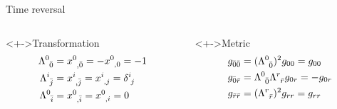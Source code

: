 \documentclass{beamer}
\let\svthefootnote\thefootnote
\newcommand\blankfootnote[1]{%
  \let\thefootnote\relax\footnotetext{#1}%
  \let\thefootnote\svthefootnote%
}
\begin{document}
\begin{frame}{Time reversal}


\begin{columns}[t]
  \begin{column}{0.4\textwidth}
    \begin{block}<+->{Transformation}
      \begin{align*}
          \tensor{\Lambda}{^0_{\bar0}} &=
          \tensor{x}{^0_{,\bar0}} = -\tensor{x}{^0_{,0}} = -1
          \\
          \tensor{\Lambda}{^i_{\bar{j}}} &=
          \tensor{x}{^i_{,\bar{j}}} = \tensor{x}{^i_{,j}} = \tensor{\delta}{^i_j}
          \\
          \tensor{\Lambda}{^0_{\bar{i}}} &=
          \tensor{x}{^0_{,\bar{i}}} = \tensor{x}{^0_{,i}} = 0
        \end{align*}
    \end{block}
  \end{column}

  \begin{column}{0.4\textwidth}
    \begin{block}<+->{Metric}
      \begin{align*}
        g_{\bar0 \bar0} &=
        (\tensor{\Lambda}{^0_{\bar0}})^2 g_{00} =
        g_{00}
        \\
        g_{\bar0 \bar{r}} &=
        \tensor{\Lambda}{^0_{\bar0}} \tensor{\Lambda}{^r_{\bar{r}}} g_{0r} =
        -g_{0r}
        \\
        g_{\bar{r} \bar{r}} &=
        (\tensor{\Lambda}{^r_{\bar{r}}})^2 g_{rr} =
        g_{rr}
      \end{align*}
    \end{block}
  \end{column}
\end{columns}

\blankfootnote{\textcite[p. 258]{Schutz}}



\end{frame}
\end{document}
